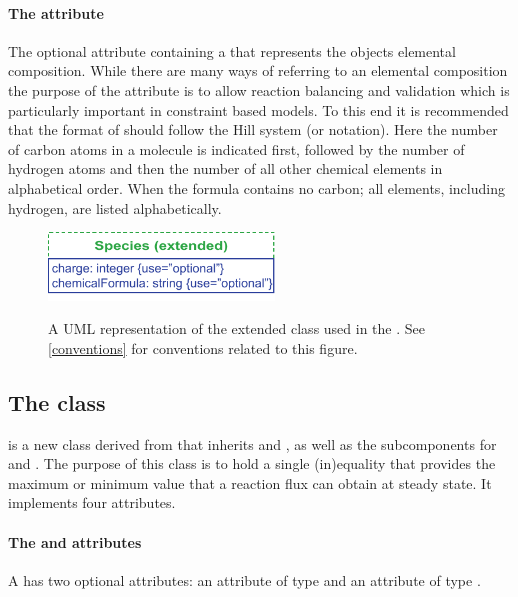 \paragraph{The  attribute}
\label{chemicalFormula-attribute}
The optional attribute  containing a
 that represents the \Species objects elemental
composition.
%
%
While there are many ways of referring to an elemental composition the
purpose of the  attribute is to allow reaction
balancing and validation which is particularly important in constraint based
models. To this end it is recommended that the format of
 should follow the Hill system (or notation). Here
the number of carbon atoms in a molecule is indicated first, followed by 
the number of hydrogen atoms and then the number of all other chemical elements
in alphabetical order. When the formula contains no carbon; all elements,
including hydrogen, are listed alphabetically.
%
\begin{figure}[h]
  \centering
  \includegraphics[width=6cm]{images/fbc_uml_species.pdf}\\
  \caption{A UML representation of the extended \SBML \Species class used in
  the \FBCPackage. See \ref{conventions} for conventions related to this
  figure.}
  \label{fig:fbc_uml_species}
\end{figure}


\subsection{The \FBC {} class}
\label{fluxbound-class}

\FluxBound is a new \FBC class derived from \SBML \SBase that inherits
 and , as well as the subcomponents for
\Annotation and \Notes. The purpose of this class is to hold a single
(in)equality that provides the maximum or minimum value that a reaction flux
can obtain at steady state. It implements four attributes.

\paragraph{The  and  attributes}
A \FluxBound has two optional attributes:  an attribute of type
 and  an attribute of type .

